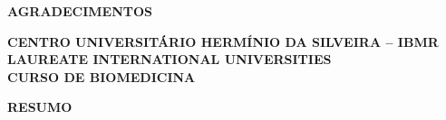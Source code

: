 \documentclass[12pt]{article} %
\begin{document}
\begin{center}

\MakeUppercase{\textbf{Agradecimentos}}

\end{center}


\newpage
\begin{center}
\textbf{CENTRO UNIVERSITÁRIO HERMÍNIO DA SILVEIRA – IBMR \\
LAUREATE INTERNATIONAL UNIVERSITIES \\
CURSO DE BIOMEDICINA}
\end{center}

\vspace{13.5cm}





\newpage
\begin{center}
\MakeUppercase{\textbf{Resumo}}
\end{center}
 \selectfont
\end{document}
